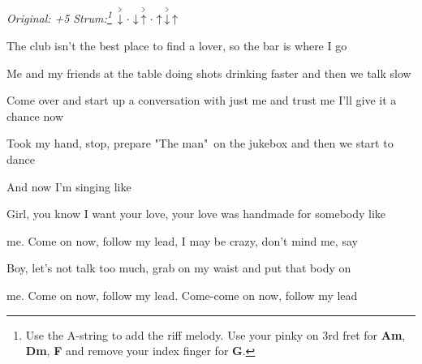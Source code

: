 \begin{song}


\begin{headerbox}
\RaiseBoxWithAccents
\textit{Original: +5} \quad
\textit{Strum:\footnote{
Use the A-string to add the riff melody. Use your pinky on 3rd fret for
\textbf{Am}, \textbf{Dm}, \textbf{F} and remove your index finger for \textbf{G}.
}} $\AccentDown\Miss\Down\AccentUp\Miss\Up\AccentDown\Up$
\end{headerbox}

\begin{hchordbox}
\end{hchordbox}

\normalsize

\bigskip

The club isn't the best place to find a lover, so the bar is where I go \par
{}Me and my friends at the table doing shots drinking faster and then we talk slow \par
Come over and start up a conversation with just me and trust me I'll give it a chance now \par
Took my hand, stop, prepare "The man"\ on the jukebox and then we start to dance \par
And now I'm singing like \par

\bigskip

\begin{chorusbox}{\PrechorusAndChorus} \par
{}Girl, you know I want your love, your love was handmade for somebody like \par
{}me. Come on now, follow my lead, I may be crazy, don't mind me, say \par
{}Boy, let's not talk too much, grab on my waist and put that body on \par
{}me. Come on now, follow my lead. Come-come on now, follow my lead \par

\bigskip


\end{chorusbox}
\end{song}
